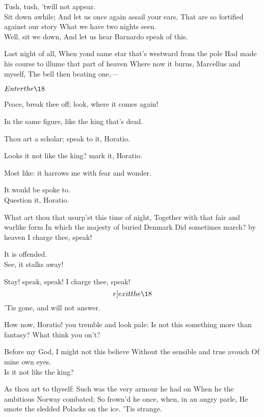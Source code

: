 \documentclass[11pt]{book}
\begin{document}
\6	Tush, tush, 'twill not appear. \\

	Sit down awhile;
	And let us once again assail your ears,
	That are so fortified against our story
	What we have two nights seen. \\

\6	Well, sit we down,
	And let us hear Barnardo speak of this.

	Last night of all,
	When yond same star that's westward from the pole
	Had made his course to illume that part of heaven
	Where now it burns, Marcellus and myself,
	The bell then beating one,---

	\(Enter the \18\)

	Peace, break thee off; look, where it comes again!

	In the same figure, like the king that's dead.

	Thou art a scholar; speak to it, Horatio.

	Looks it not like the king?  mark it, Horatio.

\6	Most like: it harrows me with fear and wonder.

	It would be spoke to. \\

	Question it, Horatio.

\6	What art thou that usurp'st this time of night,
	Together with that fair and warlike form
	In which the majesty of buried Denmark
	Did sometimes march? by heaven I charge thee, speak!

	It is offended. \\

	                  See, it stalks away!

\6	Stay! speak, speak! I charge thee, speak! \[r]exit the \18\]
	'Tis gone, and will not answer.

	How now, Horatio! you tremble and look pale:
	Is not this something more than fantasy?
	What think you on't?

\6	Before my God, I might not this believe
	Without the sensible and true avouch
	Of mine own eyes. \\

	                  Is it not like the king?

\6	As thou art to thyself:
	Such was the very armour he had on
	When he the ambitious Norway combated;
	So frown'd he once, when, in an angry parle,
	He smote the sledded Polacks on the ice.
	'Tis strange.
\end{document}
